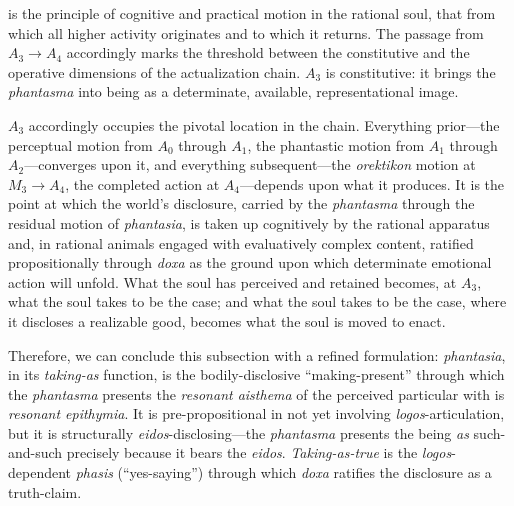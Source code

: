 \documentclass{article}
\begin{document}
is the principle of cognitive and practical motion in the rational soul, that from which all higher activity originates and to which it returns. The passage from $A_3 \to A_4$ accordingly marks the threshold between the constitutive and the operative dimensions of the actualization chain. $A_3$ is constitutive: it brings the \textit{phantasma} into being as a determinate, available, representational image. 

$A_3$ accordingly occupies the pivotal location in the chain. Everything prior---the perceptual motion from $A_0$ through $A_1$, the phantastic motion from $A_1$ through $A_2$---converges upon it, and everything subsequent---the \textit{orektikon} motion at $M_3 \rightarrow A_4$, the completed action at $A_4$---depends upon what it produces. It is the point at which the world's disclosure, carried by the \textit{phantasma} through the residual motion of \textit{phantasia}, is taken up cognitively by the rational apparatus and, in rational animals engaged with evaluatively complex content, ratified propositionally through \textit{doxa} as the ground upon which determinate emotional action will unfold. What the soul has perceived and retained becomes, at $A_3$, what the soul takes to be the case; and what the soul takes to be the case, where it discloses a realizable good, becomes what the soul is moved to enact.

Therefore, we can conclude this subsection with a refined formulation: \textit{phantasia}, in its \textit{taking-as} function, is the bodily-disclosive ``making-present'' through which the \textit{phantasma} presents the \textit{resonant aisthema} of the perceived particular with is \textit{resonant epithymia}. It is pre-propositional in not yet involving  \textit{logos}-articulation, but it is structurally \textit{eidos}-disclosing---the \textit{phantasma} presents the being \textit{as} such-and-such precisely because it bears the \textit{eidos}. \textit{Taking-as-true} is the \textit{logos}-dependent \textit{phasis} (``yes-saying'') through which \textit{doxa} ratifies the disclosure as a truth-claim. 
\end{document}
